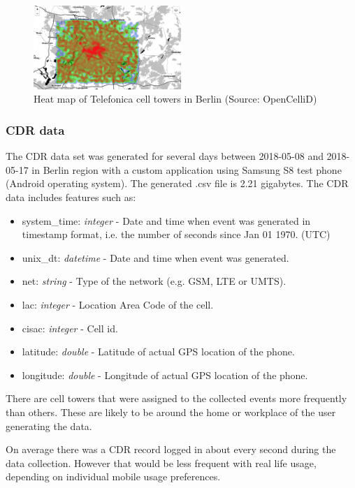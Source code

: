 \begin{figure}[h]
    \includegraphics[width=0.5\textwidth]{images/opencellid.png}
    \caption{Heat map of Telefonica cell towers in Berlin (Source: OpenCelliD) }
    \label{fig:opencellid}
\end{figure}

\subsubsection{CDR data}
The CDR data set was generated for several days between 2018-05-08 and 2018-05-17 in Berlin region with a custom application using Samsung S8 test phone (Android operating system). The generated .csv file is 2.21 gigabytes. The CDR data includes features such as:
\begin{itemize}
\item system\_time: \textit{integer} - Date and time when event was generated in timestamp format, i.e. the number of seconds since Jan 01 1970. (UTC)
\item unix\_dt: \textit{datetime} - Date and time when event was generated.
\item net: \textit{string} - Type of the network (e.g. GSM, LTE or UMTS).
\item lac: \textit{integer} - Location Area Code of the cell.
\item cisac: \textit{integer} - Cell id.
\item latitude: \textit{double} - Latitude of actual GPS location of the phone.
\item longitude: \textit{double} - Longitude of actual GPS location of the phone.
\end{itemize}

There are cell towers that were assigned to the collected events more frequently than others. These are likely to be around the home or workplace of the user generating the data.

On average there was a CDR record logged in about every second during the data collection. However that would be less frequent with real life usage, depending on individual mobile usage preferences. 

